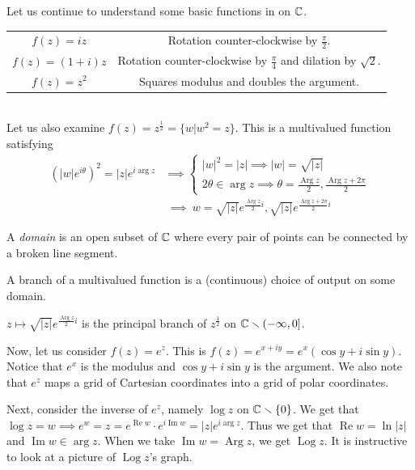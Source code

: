 \documentclass[11pt,leqno,oneside]{amsart}
\numberwithin{thm}{section}
\newcommand{\Arg}{\operatorname{Arg}}
\newcommand{\Log}{\operatorname{Log}}
\renewcommand{\Re}{\operatorname{Re}}
\renewcommand{\Im}{\operatorname{Im}}
\begin{document}
Let us continue to understand some basic functions in on ${\mathbb C}$. \\
\begin{tabular}{|c|c|}
    \hline
    $f(z) = iz$ & Rotation counter-clockwise by $\frac{\pi}{2}$. \\
    $f(z) = (1+i)z$ & Rotation counter-clockwise by $\frac{\pi}{4}$ and dilation by $\sqrt{2}$. \\
    $f(z) = z^2$ & Squares modulus and doubles the argument. \\
   \hline
\end{tabular} \\
Let us also examine $f(z) = z^{\frac{1}{2}} = \{w | w^2=z\}$. This is a multivalued function satisfying
\begin{align*}
    (|w|e^{i\theta})^2 = |z|e^{i \arg z} & \implies \begin{cases}
        |w|^2 = |z| \implies |w| = \sqrt{|z|} \\
        2\theta \in \arg z \implies \theta = \frac{\Arg z}{2}, \frac{\Arg z + 2\pi}{2}
    \end{cases} \\
    \ & \ \implies \ w = \sqrt{|z|}e^{\frac{\Arg z}{2}i}, \sqrt{|z|}e^{\frac{\Arg z + 2\pi}{2} i}
\end{align*}
\begin{defn}
    A \emph{domain} is an open subset of ${\mathbb C}$ where every pair of points can be connected by a broken line segment.
\end{defn}
\begin{defn}
    A branch of a multivalued function is a (continuous) choice of output on some domain.
\end{defn}
\begin{example}
    $z \mapsto \sqrt{|z|}e^{\frac{\Arg z}{2}i}$ is the principal branch of
    $z^{\frac{1}{2}}$ on ${\mathbb C} \smallsetminus (-\infty,0]$.
\end{example}

Now, let us consider $f(z) = e^z$. This is $f(z) = e^{x+iy} = e^x(\cos y +
i\sin y)$. Notice that $e^x$ is the modulus and $\cos y + i \sin y$ is the
argument. We also note that $e^z$ maps a grid of Cartesian coordinates into a
grid of polar coordinates.

Next, consider the inverse of $e^z$, namely $\log z$ on ${\mathbb C} \smallsetminus
\{0\}$. We get that $\log z = w \implies e^w = z = e^{\Re w} \cdot e^{i \Im w}
= |z|e^{i \arg z}$. Thus we get that $\Re w = \ln|z|$ and $\Im w \in \arg z$.
When we take $\Im w = \Arg z$, we get $\Log z$. It is instructive to look at a
picture of $\Log z$'s graph.
\end{document}
